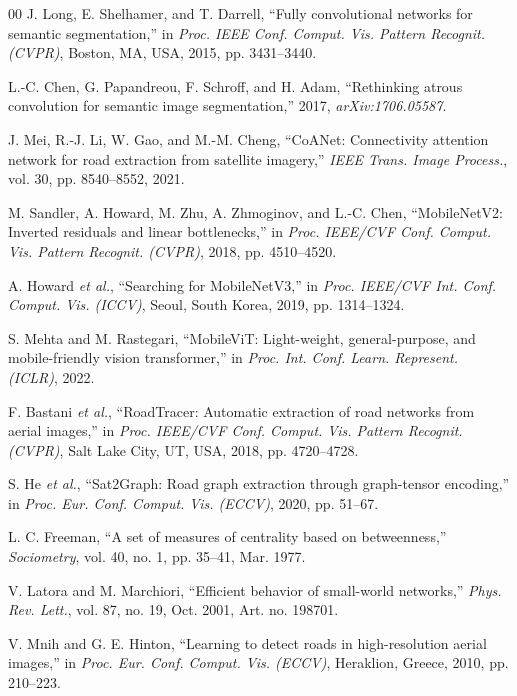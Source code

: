 \documentclass{ieeeaccess}
\begin{document}
\begin{thebibliography}{00}
J. Long, E. Shelhamer, and T. Darrell,
``Fully convolutional networks for semantic segmentation,''
in \emph{Proc. IEEE Conf. Comput. Vis. Pattern Recognit. (CVPR)},
Boston, MA, USA, 2015, pp. 3431--3440.

L.-C. Chen, G. Papandreou, F. Schroff, and H. Adam,
``Rethinking atrous convolution for semantic image segmentation,''
2017, \emph{arXiv:1706.05587}.

J. Mei, R.-J. Li, W. Gao, and M.-M. Cheng,
``CoANet: Connectivity attention network for road extraction from satellite imagery,''
\emph{IEEE Trans. Image Process.}, vol. 30, pp. 8540--8552, 2021.

M. Sandler, A. Howard, M. Zhu, A. Zhmoginov, and L.-C. Chen,
``MobileNetV2: Inverted residuals and linear bottlenecks,''
in \emph{Proc. IEEE/CVF Conf. Comput. Vis. Pattern Recognit. (CVPR)},
2018, pp. 4510--4520.

A. Howard \emph{et al.},
``Searching for MobileNetV3,''
in \emph{Proc. IEEE/CVF Int. Conf. Comput. Vis. (ICCV)},
Seoul, South Korea, 2019, pp. 1314--1324.

S. Mehta and M. Rastegari,
``MobileViT: Light-weight, general-purpose, and mobile-friendly vision transformer,''
in \emph{Proc. Int. Conf. Learn. Represent. (ICLR)},
2022.

F. Bastani \emph{et al.},
``RoadTracer: Automatic extraction of road networks from aerial images,''
in \emph{Proc. IEEE/CVF Conf. Comput. Vis. Pattern Recognit. (CVPR)},
Salt Lake City, UT, USA, 2018, pp. 4720--4728.

S. He \emph{et al.},
``Sat2Graph: Road graph extraction through graph-tensor encoding,''
in \emph{Proc. Eur. Conf. Comput. Vis. (ECCV)},
2020, pp. 51--67.

L. C. Freeman,
``A set of measures of centrality based on betweenness,''
\emph{Sociometry}, vol. 40, no. 1, pp. 35--41,
Mar. 1977.

V. Latora and M. Marchiori,
``Efficient behavior of small-world networks,''
\emph{Phys. Rev. Lett.}, vol. 87, no. 19, Oct. 2001,
Art. no. 198701.

V. Mnih and G. E. Hinton,
``Learning to detect roads in high-resolution aerial images,''
in \emph{Proc. Eur. Conf. Comput. Vis. (ECCV)},
Heraklion, Greece, 2010, pp. 210--223.


\end{thebibliography}
\end{document}
